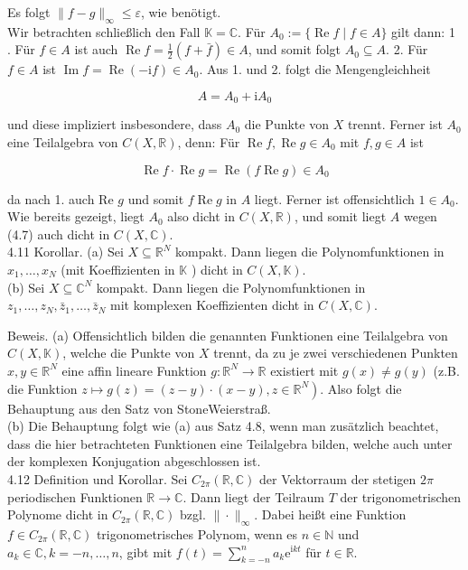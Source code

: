 \documentclass[10pt, letterpaper]{article}
\begin{document}
Es folgt $\|f-g\|_{\infty} \leq \varepsilon$, wie benötigt.\\
Wir betrachten schließlich den Fall $\mathbb{K}=\mathbb{C}$. Für $A_{0}:=\{\operatorname{Re} f \mid f \in A\}$ gilt dann: 1 . Für $f \in A$ ist auch $\operatorname{Re} f=\frac{1}{2}(f+\bar{f}) \in A$, und somit folgt $A_{0} \subseteq A$. 2. Für $f \in A$ ist $\operatorname{Im} f=\operatorname{Re}(-\mathrm{i} f) \in A_{0}$. Aus 1. und 2. folgt die Mengengleichheit

$$
A=A_{0}+\mathrm{i} A_{0}
$$

und diese impliziert insbesondere, dass $A_{0}$ die Punkte von $X$ trennt. Ferner ist $A_{0}$ eine Teilalgebra von $C(X, \mathbb{R})$, denn: Für $\operatorname{Re} f, \operatorname{Re} g \in A_{0}$ mit $f, g \in A$ ist

$$
\operatorname{Re} f \cdot \operatorname{Re} g=\operatorname{Re}(f \operatorname{Re} g) \in A_{0}
$$

da nach 1. auch Re $g$ und somit $f \operatorname{Re} g$ in $A$ liegt. Ferner ist offensichtlich $1 \in A_{0}$. Wie bereits gezeigt, liegt $A_{0}$ also dicht in $C(X, \mathbb{R})$, und somit liegt $A$ wegen (4.7) auch dicht in $C(X, \mathbb{C})$.\\
4.11 Korollar. (a) Sei $X \subseteq \mathbb{R}^{N}$ kompakt. Dann liegen die Polynomfunktionen in $x_{1}, \ldots, x_{N}$ (mit Koeffizienten in $\mathbb{K}$ ) dicht in $C(X, \mathbb{K})$.\\
(b) Sei $X \subseteq \mathbb{C}^{N}$ kompakt. Dann liegen die Polynomfunktionen in $z_{1}, \ldots, z_{N}, \bar{z}_{1}, \ldots, \bar{z}_{N}$ mit komplexen Koeffizienten dicht in $C(X, \mathbb{C})$.

Beweis. (a) Offensichtlich bilden die genannten Funktionen eine Teilalgebra von $C(X, \mathbb{K})$, welche die Punkte von $X$ trennt, da zu je zwei verschiedenen Punkten $x, y \in \mathbb{R}^{N}$ eine affin lineare Funktion $g: \mathbb{R}^{N} \rightarrow \mathbb{R}$ existiert mit $g(x) \neq g(y)$ (z.B. die Funktion $\left.z \mapsto g(z)=(z-y) \cdot(x-y), z \in \mathbb{R}^{N}\right)$. Also folgt die Behauptung aus den Satz von StoneWeierstraß.\\
(b) Die Behauptung folgt wie (a) aus Satz 4.8, wenn man zusätzlich beachtet, dass die hier betrachteten Funktionen eine Teilalgebra bilden, welche auch unter der komplexen Konjugation abgeschlossen ist.\\
4.12 Definition und Korollar. Sei $C_{2 \pi}(\mathbb{R}, \mathbb{C})$ der Vektorraum der stetigen $2 \pi$ periodischen Funktionen $\mathbb{R} \rightarrow \mathbb{C}$. Dann liegt der Teilraum $T$ der trigonometrischen Polynome dicht in $C_{2 \pi}(\mathbb{R}, \mathbb{C})$ bzgl. $\|\cdot\|_{\infty}$. Dabei heißt eine Funktion $f \in C_{2 \pi}(\mathbb{R}, \mathbb{C})$ trigonometrisches Polynom, wenn es $n \in \mathbb{N}$ und $a_{k} \in \mathbb{C}, k=-n, \ldots, n$, gibt mit $f(t)=\sum_{k=-n}^{n} a_{k} \mathrm{e}^{\mathrm{i} k t}$ für $t \in \mathbb{R}$.
\end{document}
